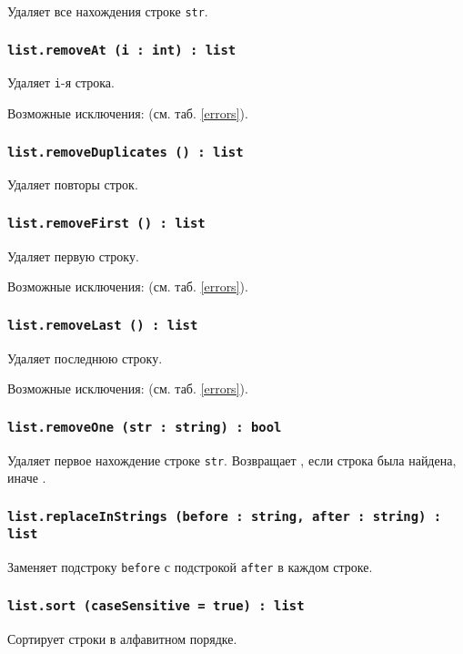 Удаляет все нахождения строке \texttt{str}.

\subsubsection{\texttt{list.removeAt (i : int) : list}}

Удаляет \texttt{i}-я строка.

Возможные исключения:  (см. таб. \ref{errors}).

\subsubsection{\texttt{list.removeDuplicates () : list}}

Удаляет повторы строк.

\subsubsection{\texttt{list.removeFirst () : list}}

Удаляет первую строку.

Возможные исключения:  (см. таб. \ref{errors}).

\subsubsection{\texttt{list.removeLast () : list}}

Удаляет последнюю строку.

Возможные исключения:  (см. таб. \ref{errors}).

\subsubsection{\texttt{list.removeOne (str : string) : bool}}

Удаляет первое нахождение строке \texttt{str}. Возвращает \true, если строка была найдена, иначе \false.

\subsubsection{\texttt{list.replaceInStrings (before : string, after : string) : list}}

Заменяет подстроку \texttt{before} с подстрокой \texttt{after} в каждом строке.

\subsubsection{\texttt{list.sort (caseSensitive = true) : list}}

Сортирует строки в алфавитном порядке.

